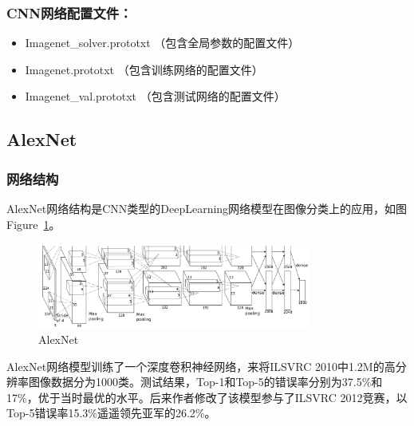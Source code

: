 \documentclass[12pt]{article}
\begin{document}
\subsubsection{CNN网络配置文件：}
\begin{itemize}
\item Imagenet\_solver.prototxt （包含全局参数的配置文件）
\item Imagenet.prototxt （包含训练网络的配置文件）
\item Imagenet\_val.prototxt （包含测试网络的配置文件）
\end{itemize}



\subsection{AlexNet}
\subsubsection{网络结构}
AlexNet网络结构是CNN类型的DeepLearning网络模型在图像分类上的应用，如图Figure~\ref{fig:framework}。

\begin{figure}[!ht]
\centering
\includegraphics[width=0.8\textwidth]{AlexNet}
\caption{AlexNet}
\label{fig:framework}
\end{figure}

AlexNet网络模型训练了一个深度卷积神经网络，来将ILSVRC 2010中1.2M的高分辨率图像数据分为1000类。测试结果，Top-1和Top-5的错误率分别为37.5\%和17\%，优于当时最优的水平。后来作者修改了该模型参与了ILSVRC 2012竞赛，以Top-5错误率15.3\%遥遥领先亚军的26.2\%。
\end{document}
